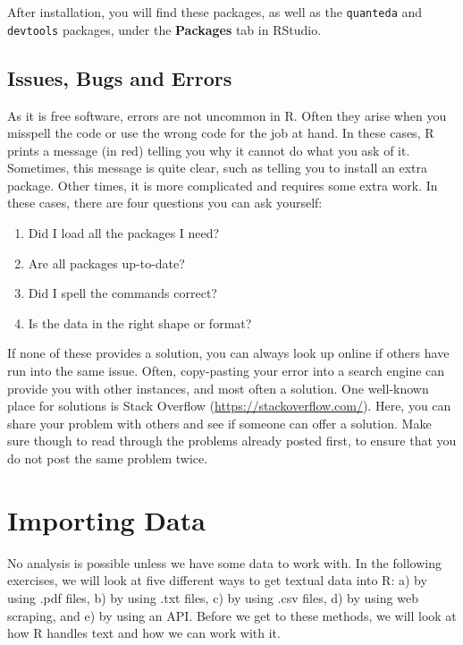 \documentclass[
]{book}
\providecommand{\tightlist}{%
  \setlength{\itemsep}{0pt}\setlength{\parskip}{0pt}}
\begin{document}
After installation, you will find these packages, as well as the \texttt{quanteda} and \texttt{devtools} packages, under the \textbf{Packages} tab in RStudio.

\hypertarget{issues-bugs-and-errors}{%
\section{Issues, Bugs and Errors}\label{issues-bugs-and-errors}}

As it is free software, errors are not uncommon in R. Often they arise when you misspell the code or use the wrong code for the job at hand. In these cases, R prints a message (in red) telling you why it cannot do what you ask of it. Sometimes, this message is quite clear, such as telling you to install an extra package. Other times, it is more complicated and requires some extra work. In these cases, there are four questions you can ask yourself:

\begin{enumerate}
\def\labelenumi{\arabic{enumi}.}
\tightlist
\item
  Did I load all the packages I need?
\item
  Are all packages up-to-date?
\item
  Did I spell the commands correct?
\item
  Is the data in the right shape or format?
\end{enumerate}

If none of these provides a solution, you can always look up online if others have run into the same issue. Often, copy-pasting your error into a search engine can provide you with other instances, and most often a solution. One well-known place for solutions is Stack Overflow (\url{https://stackoverflow.com/}). Here, you can share your problem with others and see if someone can offer a solution. Make sure though to read through the problems already posted first, to ensure that you do not post the same problem twice.

\hypertarget{importing-data}{%
\chapter{Importing Data}\label{importing-data}}

No analysis is possible unless we have some data to work with. In the following exercises, we will look at five different ways to get textual data into R: a) by using .pdf files, b) by using .txt files, c) by using .csv files, d) by using web scraping, and e) by using an API. Before we get to these methods, we will look at how R handles text and how we can work with it.
\end{document}
